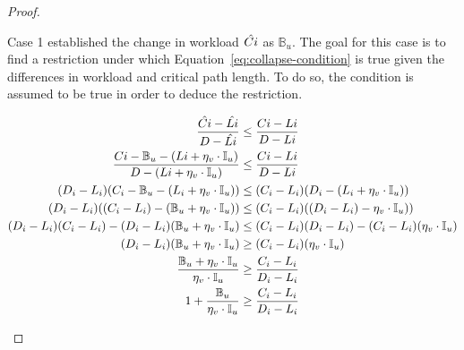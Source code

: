 \begin{theorem}
\begin{proof}
\begin{case}
      Case 1 established the change in workload
      ${\hat{C{i}}}$ as ${\mathbb{B}_u}$. The goal for this
      case is to find a restriction under which
      Equation~\ref{eq:collapse-condition} is true given the
      differences in workload and critical path length. To do so, the
      condition is assumed to be true in order to deduce the restriction.

      \begin{align*}
        \indent
        \frac{\hat{\workload{i}} - \hat{\criticalpathlen{i}}} 
             {\Deadline{i} - \hat{\criticalpathlen{i}}} &\le
        \frac{\workload{i} - \criticalpathlen{i}}
             {\Deadline{i} - \criticalpathlen{i}} \\
        \frac{\workload{i} - \mathbb{B}_u - (\criticalpathlen{i} + \eta_v
          \cdot \mathbb{I}_u)} 
             {\Deadline{i} - (\criticalpathlen{i} + \eta_v
          \cdot \mathbb{I}_u)} &\le
        \frac{\workload{i} - \criticalpathlen{i}}
             {\Deadline{i} - \criticalpathlen{i}} \\
        (D_i - L_i)(C_i - \mathbb{B}_u - (L_i + \eta_v \cdot \mathbb{I}_u))
             &\le
             (C_i - L_i)(D_i - (L_i + \eta_v \cdot \mathbb{I}_u)) \\
        (D_i - L_i)((C_i - L_i) - (\mathbb{B}_u + \eta_v \cdot \mathbb{I}_u))
             &\le
             (C_i - L_i)((D_i - L_i) - \eta_v \cdot \mathbb{I}_u)) \\
        (D_i - L_i)(C_i - L_i) -
             (D_i - L_i)(\mathbb{B}_u + \eta_v \cdot \mathbb{I}_u)
             &\le
             (C_i - L_i)(D_i - L_i) - (C_i - L_i)(\eta_v \cdot \mathbb{I}_u) \\
        (D_i - L_i)(\mathbb{B}_u + \eta_v \cdot \mathbb{I}_u)
             &\ge
             (C_i - L_i)(\eta_v \cdot \mathbb{I}_u) \\
        \frac{\mathbb{B}_u + \eta_v \cdot \mathbb{I}_u}
             {\eta_v \cdot \mathbb{I}_u}
             &\ge
             \frac{C_i - L_i}{D_i - L_i} \\
        1 + \frac{\mathbb{B}_u}
             {\eta_v \cdot \mathbb{I}_u}
             &\ge
             \frac{C_i - L_i}{D_i - L_i}
      \end{align*}
      
      
    \end{case}

    \begin{case}
    \end{case}
    \begin{case}
    \end{case}


\end{proof}
\end{theorem}
